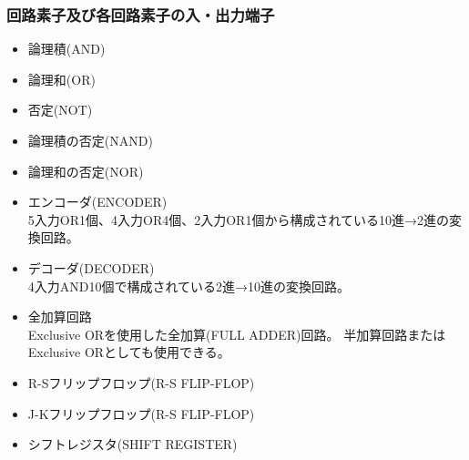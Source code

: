 \documentclass[dvipdfmx]{jsarticle}
\begin{document}
				\subsubsection{回路素子及び各回路素子の入・出力端子}
					\begin{itemize}
						\item 論理積(AND)
						\item 論理和(OR)
						\item 否定(NOT)
						\item 論理積の否定(NAND)
						\item 論理和の否定(NOR)
						\item エンコーダ(ENCODER) \\
						5入力OR1個、4入力OR4個、2入力OR1個から構成されている10進→2進の変換回路。
						\item デコーダ(DECODER) \\
						4入力AND10個で構成されている2進→10進の変換回路。
						\item 全加算回路 \\
						Exclusive ORを使用した全加算(FULL ADDER)回路。
						半加算回路またはExclusive ORとしても使用できる。
						\item R-Sフリップフロップ(R-S FLIP-FLOP)
						\item J-Kフリップフロップ(R-S FLIP-FLOP)
						\item シフトレジスタ(SHIFT REGISTER)
					\end{itemize}
\end{document}
